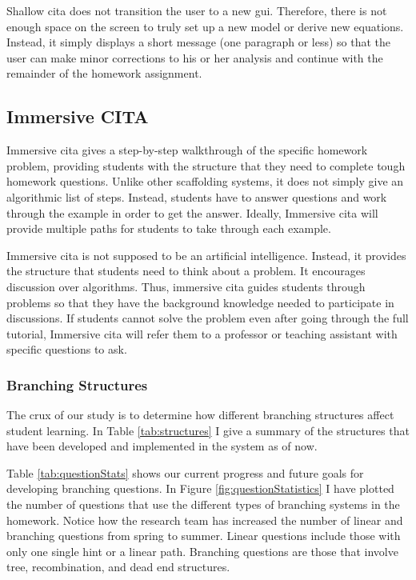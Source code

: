 Shallow \gls{cita} does not transition the user to a new \gls{gui}. Therefore, there is not enough space on the screen to truly set up a new model or derive new equations. Instead, it simply displays a short message (one paragraph or less) so that the user can make minor corrections to his or her analysis and continue with the remainder of the homework assignment.

\subsection{Immersive CITA}

Immersive \gls{cita} gives a step-by-step walkthrough of the specific homework problem, providing students with the structure that they need to complete tough homework questions. Unlike other scaffolding systems, it does not simply give an algorithmic list of steps. Instead, students have to answer questions and work through the example in order to get the answer. Ideally, Immersive \gls{cita} will provide multiple paths for students to take through each example.

Immersive \gls{cita} is not supposed to be an artificial intelligence. Instead, it provides the structure that students need to think about a problem. It encourages discussion over algorithms. Thus, immersive \gls{cita} guides students through problems so that they have the background knowledge needed to participate in discussions. If students cannot solve the problem even after going through the full tutorial, Immersive \gls{cita} will refer them to a professor or teaching assistant with specific questions to ask.

\subsubsection{Branching Structures}

The crux of our study is to determine how different branching structures affect student learning. In Table \ref{tab:structures} I give a summary of the structures that have been developed and implemented in the system as of now.

Table \ref{tab:questionStats} shows our current progress and future goals for developing branching questions. In Figure \ref{fig:questionStatistics} I have plotted the number of questions that use the different types of branching systems in the homework. Notice how the research team has increased the number of linear and branching questions from spring to summer. Linear questions include those with only one single hint or a linear path. Branching questions are those that involve tree, recombination, and dead end structures.

